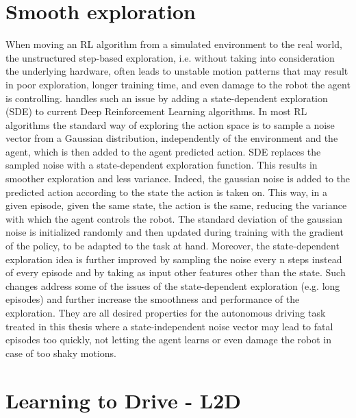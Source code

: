 \section{Smooth exploration}
When moving an RL algorithm from a simulated environment to the real world, the unstructured step-based exploration, i.e. without taking into consideration the underlying hardware, often leads to unstable motion patterns that may result in poor exploration, longer training time, and even damage to the robot the agent is controlling. \citet{pmlr-v164-raffin22a} handles such an issue by adding a state-dependent exploration (SDE) to current Deep Reinforcement Learning algorithms. In most RL algorithms the standard way of exploring the action space is to sample a noise vector from a Gaussian distribution, independently of the environment and the agent, which is then added to the agent predicted action. SDE replaces the sampled noise with a state-dependent exploration function. This results in smoother exploration and less variance. Indeed, the gaussian noise is added to the predicted action according to the state the action is taken on. This way, in a given episode, given the same state, the action is the same, reducing the variance with which the agent controls the robot. The standard deviation of the gaussian noise is initialized randomly and then updated during training with the gradient of the policy, to be adapted to the task at hand.
Moreover, the state-dependent exploration idea is further improved by sampling the noise every n steps instead of every episode and by taking as input other features other than the state. Such changes address some of the issues of the state-dependent exploration (e.g. long episodes) and further increase the smoothness and performance of the exploration. They are all desired properties for the autonomous driving task treated in this thesis where a state-independent noise vector may lead to fatal episodes too quickly, not letting the agent learns or even damage the robot in case of too shaky motions.

\section{Learning to Drive - L2D}

